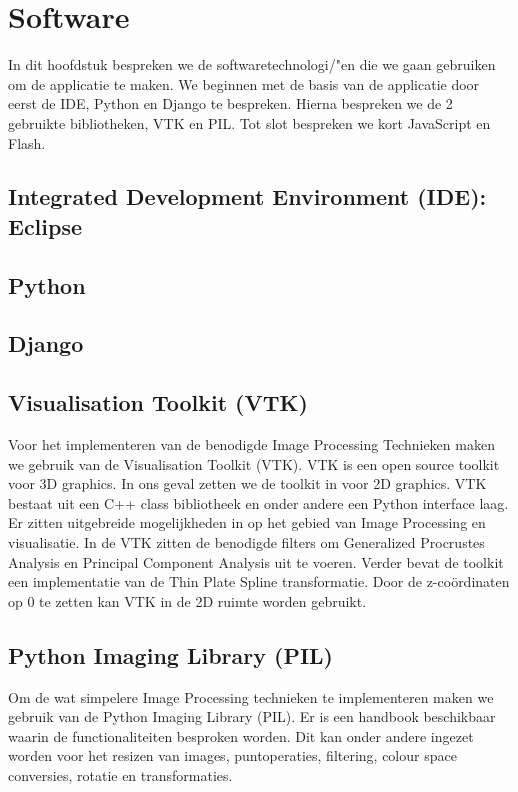 \section{Software}
\label{Software}
In dit hoofdstuk bespreken we de softwaretechnologi/"{e}n die we gaan gebruiken om de applicatie te maken. 
We beginnen met de basis van de applicatie door eerst de IDE, Python en Django te bespreken. 
Hierna bespreken we de 2 gebruikte bibliotheken, VTK en PIL. 
Tot slot bespreken we kort JavaScript en Flash.

\subsection{Integrated Development Environment (IDE): Eclipse}

\subsection{Python}

\subsection{Django}

\subsection{Visualisation Toolkit (VTK)}
Voor het implementeren van de benodigde Image Processing Technieken maken we gebruik van de Visualisation Toolkit (VTK)\cite{vtk}. 
VTK is een open source toolkit voor 3D graphics. 
In ons geval zetten we de toolkit in voor 2D graphics. 
VTK bestaat uit een C++ class bibliotheek en onder andere een Python interface laag.\cite{vtk2} 
Er zitten uitgebreide mogelijkheden in op het gebied van Image Processing en visualisatie.
In de VTK zitten de benodigde filters om Generalized Procrustes Analysis en Principal Component Analysis uit te voeren. 
Verder bevat de toolkit een implementatie van de Thin Plate Spline transformatie. 
Door de z-co\"{o}rdinaten op 0 te zetten kan VTK in de 2D ruimte worden gebruikt. 

\subsection{Python Imaging Library (PIL)}
Om de wat simpelere Image Processing technieken te implementeren maken we gebruik van de Python Imaging Library (PIL)\cite{pil}. 
Er is een handbook beschikbaar waarin de functionaliteiten besproken worden.\cite{pilhandbook} 
Dit kan onder andere ingezet worden voor het resizen van images, puntoperaties, filtering, colour space conversies, rotatie en transformaties. 

